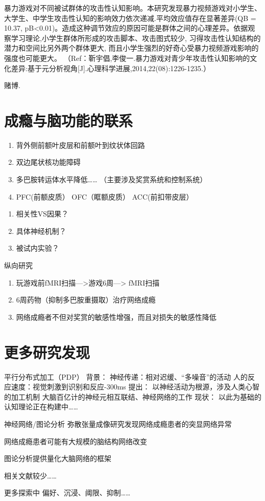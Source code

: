 暴力游戏对不同被试群体的攻击性认知影响。本研究发现暴力视频游戏对小学生、大学生、中学生攻击性认知的影响效力依次递减.平均效应值存在显著差异(QB = 10.37, pB<0.01)。造成这种调节效应的原因可能是群体之间的心理差异。依据观察学习理论,小学生群体所形成的攻击脚本、攻击图式较少, 习得攻击性认知结构的潜力和空间比另外两个群体更大, 而且小学生强烈的好奇心受暴力视频游戏影响的强度也可能更大。
（Ref：靳宇倡,李俊一.暴力游戏对青少年攻击性认知影响的文化差异:基于元分析视角[J].心理科学进展,2014,22(08):1226-1235.）





  赌博.








\section*{成瘾与脑功能的联系}

\begin{enumerate}
\item 背外侧前额叶皮层和前额叶到纹状体回路
\item 双边尾状核功能障碍
\item 多巴胺转运体水平降低……
（主要涉及奖赏系统和控制系统）
\item PFC(前额皮质） OFC（眶额皮质）  ACC(前扣带皮层）
\end{enumerate}

\begin{enumerate}
\item 相关性VS因果？
\item 具体神经机制？
\item 被试内实验？
\end{enumerate}

{纵向研究}
\begin{enumerate}
\item 玩游戏前fMRI扫描—>游戏6周—> fMRI扫描

\item 6周药物（抑制多巴胺重摄取）治疗网络成瘾

\item 网络成瘾者不但对奖赏的敏感性增强，而且对损失的敏感性降低

\end{enumerate}

\section*{更多研究发现}
平行分布式加工（PDP）
背景：
神经传递：相对迟缓、“多噪音”的活动
人的反应速度：视觉刺激到识别和反应-300ms
提出：
以神经活动为根源，涉及人类心智的加工机制
大脑百亿计的神经元相互联结、神经网络的工作
现状：
以此为基础的认知理论正在构建中……


神经网络/图论分析
弥散张量成像研究发现网络成瘾患者的突显网络异常

网络成瘾患者可能有大规模的脑结构网络改变

图论分析提供量化大脑网络的框架

相关文献较少……

更多探索中
偏好、沉浸、阈限、抑制……


